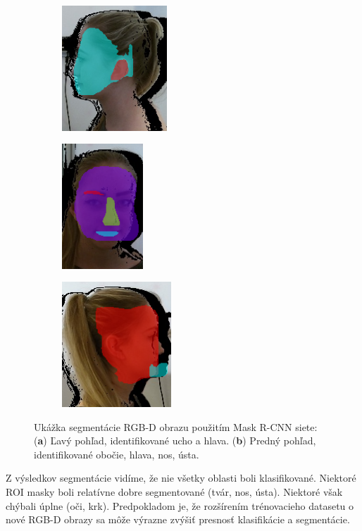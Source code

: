 \begin{figure}[H]
	\centering
	\begin{subfigure}[b]{0.32\textwidth}
		\centering
		\includegraphics[height=4.7cm]{figures/rcnn_detect1.png}
		\caption{}
		\label{fig:rcnn:label:a}
	\end{subfigure}
	\hskip 0.0in
	\begin{subfigure}[b]{0.32\textwidth}
		\centering
		\includegraphics[height=4.7cm]{figures/rcnn_detect2.png}
		\caption{}
		\label{fig:rcnn:label:b}
	\end{subfigure}
	\begin{subfigure}[b]{0.32\textwidth}
		\centering
		\includegraphics[height=4.7cm]{figures/rcnn_detect3.png}
		\caption{}
		\label{fig:rcnn:label:c}
	\end{subfigure}
	\caption{Ukážka segmentácie RGB-D obrazu použitím Mask R-CNN siete: (\textbf{a}) Ľavý pohľad, identifikované ucho a hlava. (\textbf{b}) Predný pohľad, identifikované obočie, hlava, nos, ústa.}
	\label{fig:rcnn:label}
\end{figure}

Z výsledkov segmentácie vidíme, že nie všetky oblasti boli klasifikované.
Niektoré ROI masky boli relatívne dobre segmentované (tvár, nos, ústa). Niektoré však chýbali úplne (oči, krk). Predpokladom je, že rozšírením trénovacieho datasetu o nové RGB-D obrazy sa môže výrazne zvýšiť presnosť klasifikácie a segmentácie. \newline

